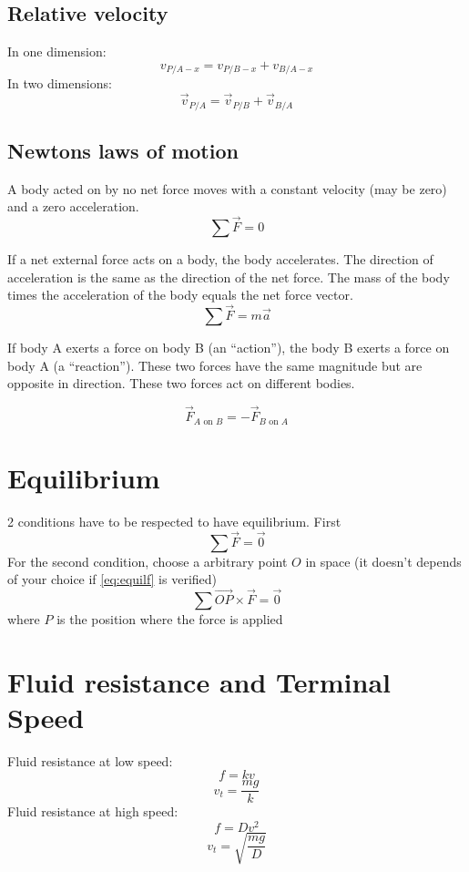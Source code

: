 \documentclass[a4paper,10pt]{article}
\begin{document}
\subsection{Relative velocity}
In one dimension: 
\[ v_{P/A-x} = v_{P/B-x} + v_{B/A-x} \]
In two dimensions:
\[ \vec{v}_{P/A} = \vec{v}_{P/B} + \vec{v}_{B/A} \]

\subsection{Newtons laws of motion}

A body acted on by no net force moves with a constant velocity (may be zero) and a zero acceleration.
\[ \sum \vec{F} = 0 \]

If a net external force acts on a body, the body accelerates. The direction of acceleration is the same as the direction of the net force. The mass of the body times the acceleration of the body equals the net force vector.
\[ \sum \vec{F} = m \vec{a} \]

If body A exerts a force on body B (an ``action''), the body B exerts a force on body A (a ``reaction''). These two forces have the same magnitude but are opposite in direction. These two forces act on different bodies. 

\[ \vec{F}_{A\textrm{ on }B} = -\vec{F}_{B\textrm{ on }A} \]

\section{Equilibrium}
2 conditions have to be respected to have equilibrium. First
\begin{equation}\label{eq:equilf}
	\sum \vec{F} = \vec{0}
\end{equation}
For the second condition, choose a arbitrary point $O$ in space
(it doesn't depends of your choice if \eqref{eq:equilf} is verified)
$$\sum \vec{OP} \times \vec{F} = \vec{0}$$
where $P$ is the position where the force is applied

\section{Fluid resistance and Terminal Speed}
Fluid resistance at low speed:
\[ f = kv \]
\[ v_t = \frac{mg}{k} \]
Fluid resistance at high speed:
\[ f = Dv^2 \]
\[ v_t = \sqrt{ \frac{mg}{D} }\]
\end{document}
